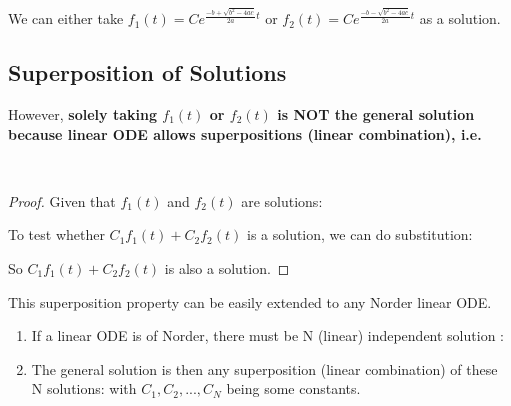 \documentclass[class=article, crop=false, 12pt]{standalone}
\begin{document}
We can either take $f_1(t) = Ce^{\frac{-b+ \sqrt{b^2-4ac}}{2a} t}$ or 
$f_2(t) = Ce^{\frac{-b- \sqrt{b^2-4ac}}{2a} t}$ as a solution. 

\subsection{Superposition of Solutions}

However, \bf{solely taking $f_1(t)$ or $f_2(t)$ is NOT the general solution}
because linear ODE allows superpositions (linear combination), i.e. 
\begin{center}
\end{center}

\\

\begin{proof}
    Given that $f_1(t)$ and $f_2(t)$ are solutions:

    To test whether $C_1f_1(t)+C_2f_2(t)$ is a solution, we can do substitution:

    So $C_1f_1(t)+C_2f_2(t)$ is also a solution.
\end{proof}

\begin{notation}
    This superposition property can be easily extended to any N\Nth order linear ODE. 
    \begin{enumerate}
        \item If a linear ODE is of N\Nth order, 
        there must be N (linear) independent solution :

        \item The general solution is then any superposition (linear combination) of these N solutions:
        with $C_1, C_2,...,C_N$ being some constants.
    \end{enumerate}
\end{notation}
\end{document}
